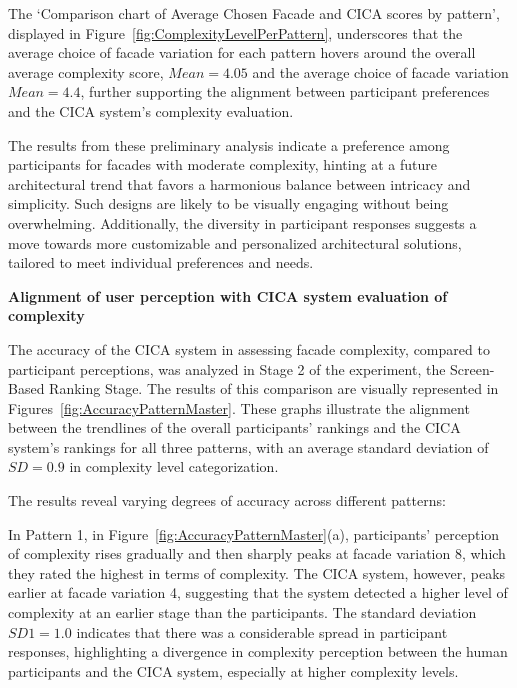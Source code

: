 
The `Comparison chart of Average Chosen Facade and CICA scores by pattern', displayed in Figure~\ref{fig:ComplexityLevelPerPattern}, underscores that the average choice of facade variation for each pattern hovers around the overall average complexity score, \(Mean = 4.05\) and the average choice of facade variation \(Mean = 4.4\), further supporting the alignment between participant preferences and the CICA system's complexity evaluation.


The results from these preliminary analysis indicate a preference among participants for facades with moderate complexity, hinting at a future architectural trend that favors a harmonious balance between intricacy and simplicity.
Such designs are likely to be visually engaging without being overwhelming.
Additionally, the diversity in participant responses suggests a move towards more customizable and personalized architectural solutions, tailored to meet individual preferences and needs.

\textbf{Alignment of user perception with CICA system evaluation of complexity}

The accuracy of the CICA system in assessing facade complexity, compared to participant perceptions, was analyzed in Stage 2 of the experiment, the Screen-Based Ranking Stage.
The results of this comparison are visually represented in Figures~\ref{fig:AccuracyPatternMaster}.
These graphs illustrate the alignment between the trendlines of the overall participants' rankings and the CICA system's rankings for all three patterns, with an average standard deviation of \(SD = 0.9\) in complexity level categorization.

The results reveal varying degrees of accuracy across different patterns:

In Pattern 1, in Figure~\ref{fig:AccuracyPatternMaster}(a), participants' perception of complexity rises gradually and then sharply peaks at facade variation 8, which they rated the highest in terms of complexity.
The CICA system, however, peaks earlier at facade variation 4, suggesting that the system detected a higher level of complexity at an earlier stage than the participants.
The standard deviation \(SD1 = 1.0\) indicates that there was a considerable spread in participant responses, highlighting a divergence in complexity perception between the human participants and the CICA system, especially at higher complexity levels.

